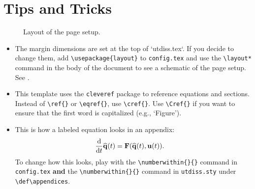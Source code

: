 \chapter{Tips and Tricks}
\label{appendix:tips}

\begin{figure}
    \centering
    \layout*
    \vspace{.75in}
    \caption{Layout of the page setup.}
    \label{figure:layout}
\end{figure}

\begin{itemize}
\item The margin dimensions are set at the top of `utdiss.tex`. If you decide to change them, add \verb"\usepackage{layout}" to \texttt{config.tex} and use the \verb"\layout*" command in the body of the document to see a schematic of the page setup.
See .

\item This template uses the \texttt{cleveref} package to reference equations and sections.
Instead of \verb"\ref{}" or \verb"\eqref{}", use \verb"\cref{}".
Use \verb"\Cref{}" if you want to ensure that the first word is capitalized (e.g., `Figure').

\item This is how a labeled equation looks in an appendix:
\begin{align}
    \frac{\textup{d}}{\textup{d}t}\widehat{\mathbf{q}}(t)
    &= \mathbf{F}(\widehat{\mathbf{q}}(t), \mathbf{u}(t)).
\end{align}
To change how this looks, play with the \verb"\numberwithin{}{}" command in \texttt{config.tex} \textbf{and} the \verb"\numberwithin{}{}" command in \texttt{utdiss.sty} under \verb"\def\appendices".
\end{itemize}
